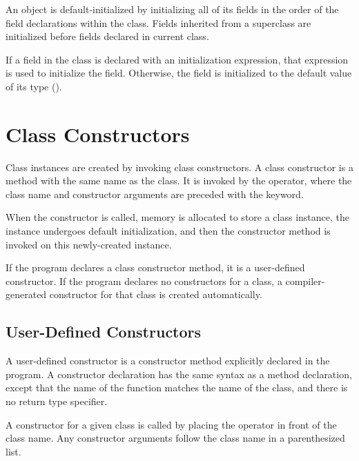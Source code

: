 An object is default-initialized by initializing all of its fields in
the order of the field declarations within the class. Fields inherited
from a superclass are initialized before fields declared in current class.

If a field in the class is declared with an initialization expression, that
expression is used to initialize the field.  Otherwise, the field is
initialized to the default value of its type
().

\section{Class Constructors}
\label{Class_Constructors}
\label{Class_New}

Class instances are created by invoking class constructors.
A class constructor is a method with the same name as the class.
It is invoked by the  operator, where the
class name and constructor arguments are preceded with the
 keyword.

When the constructor is called, memory is allocated to store
a class instance, the instance undergoes default initialization, and
then the constructor method is invoked on this newly-created
instance.

If the program declares a class constructor method,
it is a user-defined constructor.  
If the program declares no constructors for a class,
a compiler-generated constructor for that class is created automatically.

\subsection{User-Defined Constructors}
\label{User_Defined_Constructors}

A user-defined constructor is a constructor method explicitly declared
in the program.  A constructor declaration has the same
syntax as a method declaration, except that the name of the function matches
the name of the class, and there is no return type specifier.

A constructor for a given class is called by placing the  operator
in front of the class name.  Any constructor arguments follow the class name in a
parenthesized list.

